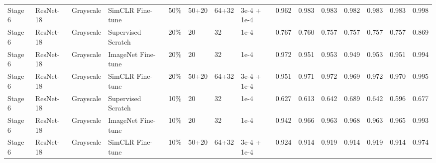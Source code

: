 \begin{table}[htbp]
{\begin{tabular}{llllrlllrrrrrrr}
Stage 6 & ResNet-18 & Grayscale & SimCLR Fine-tune & 50\% & 50+20 & 64+32 & 3e-4 + 1e-4 & 0.962 & 0.983 & 0.983 & 0.982 & 0.983 & 0.983 & 0.998 \\
Stage 6 & ResNet-18 & Grayscale & Supervised Scratch & 20\% & 20 & 32 & 1e-4 & 0.767 & 0.760 & 0.757 & 0.757 & 0.757 & 0.757 & 0.869 \\
Stage 6 & ResNet-18 & Grayscale & ImageNet Fine-tune & 20\% & 20 & 32 & 1e-4 & 0.972 & 0.951 & 0.953 & 0.949 & 0.953 & 0.951 & 0.994 \\
Stage 6 & ResNet-18 & Grayscale & SimCLR Fine-tune & 20\% & 50+20 & 64+32 & 3e-4 + 1e-4 & 0.951 & 0.971 & 0.972 & 0.969 & 0.972 & 0.970 & 0.995 \\
Stage 6 & ResNet-18 & Grayscale & Supervised Scratch & 10\% & 20 & 32 & 1e-4 & 0.627 & 0.613 & 0.642 & 0.689 & 0.642 & 0.596 & 0.677 \\
Stage 6 & ResNet-18 & Grayscale & ImageNet Fine-tune & 10\% & 20 & 32 & 1e-4 & 0.942 & 0.966 & 0.963 & 0.968 & 0.963 & 0.965 & 0.993 \\
Stage 6 & ResNet-18 & Grayscale & SimCLR Fine-tune & 10\% & 50+20 & 64+32 & 3e-4 + 1e-4 & 0.924 & 0.914 & 0.919 & 0.914 & 0.919 & 0.914 & 0.974 \\
\hline
\end{tabular}%
}
\label{tab:all-model-results}
\end{table}
